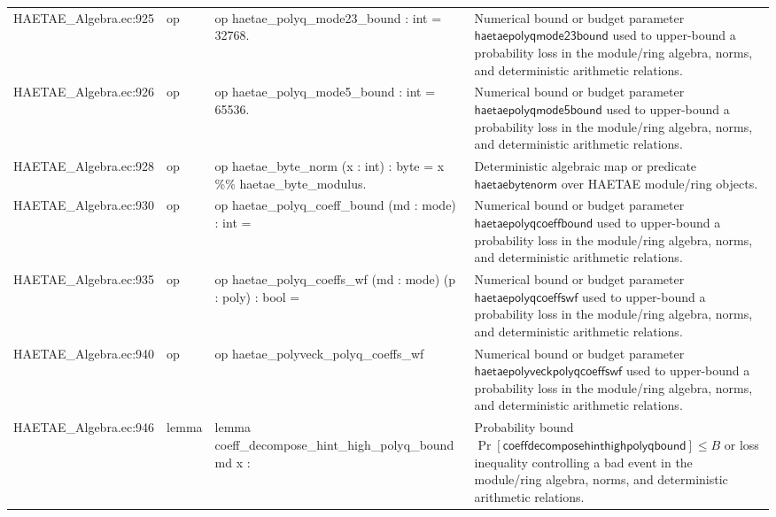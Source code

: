 \documentclass[10pt]{article}
\begin{document}
\begin{longtable}{L{0.11\textwidth}L{0.055\textwidth}L{0.385\textwidth}L{0.41\textwidth}}
HAETAE\_\allowbreak{}Algebra.\allowbreak{}ec:\allowbreak{}925 & op & {\ttfamily\scriptsize op haetae\_\allowbreak{}polyq\_\allowbreak{}mode23\_\allowbreak{}bound : int = 32768.} & Numerical bound or budget parameter $\mathsf{haetaepolyqmode23bound}$ used to upper-bound a probability loss in the module/ring algebra, norms, and deterministic arithmetic relations. \\
HAETAE\_\allowbreak{}Algebra.\allowbreak{}ec:\allowbreak{}926 & op & {\ttfamily\scriptsize op haetae\_\allowbreak{}polyq\_\allowbreak{}mode5\_\allowbreak{}bound : int = 65536.} & Numerical bound or budget parameter $\mathsf{haetaepolyqmode5bound}$ used to upper-bound a probability loss in the module/ring algebra, norms, and deterministic arithmetic relations. \\
HAETAE\_\allowbreak{}Algebra.\allowbreak{}ec:\allowbreak{}928 & op & {\ttfamily\scriptsize op haetae\_\allowbreak{}byte\_\allowbreak{}norm (x : int) : byte = x \%\% haetae\_\allowbreak{}byte\_\allowbreak{}modulus.} & Deterministic algebraic map or predicate $\mathsf{haetaebytenorm}$ over HAETAE module/ring objects. \\
HAETAE\_\allowbreak{}Algebra.\allowbreak{}ec:\allowbreak{}930 & op & {\ttfamily\scriptsize op haetae\_\allowbreak{}polyq\_\allowbreak{}coeff\_\allowbreak{}bound (md : mode) : int =} & Numerical bound or budget parameter $\mathsf{haetaepolyqcoeffbound}$ used to upper-bound a probability loss in the module/ring algebra, norms, and deterministic arithmetic relations. \\
HAETAE\_\allowbreak{}Algebra.\allowbreak{}ec:\allowbreak{}935 & op & {\ttfamily\scriptsize op haetae\_\allowbreak{}polyq\_\allowbreak{}coeffs\_\allowbreak{}wf (md : mode) (p : poly) : bool =} & Numerical bound or budget parameter $\mathsf{haetaepolyqcoeffswf}$ used to upper-bound a probability loss in the module/ring algebra, norms, and deterministic arithmetic relations. \\
HAETAE\_\allowbreak{}Algebra.\allowbreak{}ec:\allowbreak{}940 & op & {\ttfamily\scriptsize op haetae\_\allowbreak{}polyveck\_\allowbreak{}polyq\_\allowbreak{}coeffs\_\allowbreak{}wf} & Numerical bound or budget parameter $\mathsf{haetaepolyveckpolyqcoeffswf}$ used to upper-bound a probability loss in the module/ring algebra, norms, and deterministic arithmetic relations. \\
HAETAE\_\allowbreak{}Algebra.\allowbreak{}ec:\allowbreak{}946 & lemma & {\ttfamily\scriptsize lemma coeff\_\allowbreak{}decompose\_\allowbreak{}hint\_\allowbreak{}high\_\allowbreak{}polyq\_\allowbreak{}bound md x :} & Probability bound $\Pr[\mathsf{coeffdecomposehinthighpolyqbound}]\le B$ or loss inequality controlling a bad event in the module/ring algebra, norms, and deterministic arithmetic relations. \\

\end{longtable}
\end{document}
